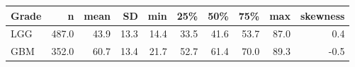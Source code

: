 \begin{tabular}{lrrrrrrrrr}
\toprule
\textbf{Grade} & \textbf{n} & \textbf{mean} & \textbf{SD} & \textbf{min} & \textbf{25\%} & \textbf{50\%} & \textbf{75\%} & \textbf{max} & \textbf{skewness} \\
\midrule
LGG & 487.0 & 43.9 & 13.3 & 14.4 & 33.5 & 41.6 & 53.7 & 87.0 & 0.4 \\
GBM & 352.0 & 60.7 & 13.4 & 21.7 & 52.7 & 61.4 & 70.0 & 89.3 & -0.5 \\
\bottomrule
\end{tabular}
